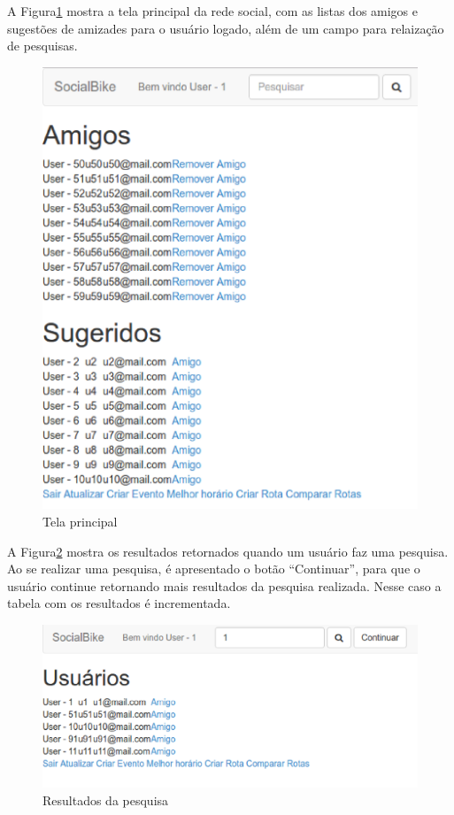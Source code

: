A Figura\ref{home} mostra a tela principal da rede social, com as listas dos amigos e sugestões de amizades para o usuário logado, além de um campo para relaização de pesquisas.

\newpage
\begin{figure}[!h]
	\centering
	\includegraphics[scale=0.5]{figuras/resultados/home.eps}
	\caption[Tela principal]{Tela principal}
	\label{home}
\end{figure}

A Figura\ref{pesquisa} mostra os resultados retornados quando um usuário faz uma pesquisa. Ao se realizar uma pesquisa, é apresentado o botão ``Continuar'', para que o usuário continue retornando mais resultados da pesquisa realizada. Nesse caso a tabela com os resultados é incrementada.

\begin{figure}[!h]
	\centering
	\includegraphics[scale=0.5]{figuras/resultados/pesquisa.eps}
	\caption[Resultados da pesquisa]{Resultados da pesquisa}
	\label{pesquisa}
\end{figure}

